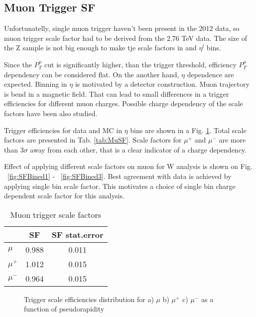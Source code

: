\subsection{Muon Trigger SF}
Unfortunatelly, single muon trigger haven't been present in the 2012 data, so muon trigger scale factor had to be derived from the 2.76 TeV data. The size of the Z sample is not big enough to make tje scale factors in \ptl and $\eta^{l}$ bins. 

Since the $P_{T}^{\mu}$ cut is significantly higher, than the trigger threshold, efficiency $P_{T}^{\mu}$ dependency can be considered flat. On the another hand, $\eta$ dependence are expected. Binning in $\eta$ is motivated by a detector construction. Muon trajectory is bend in a magnetic field. That can lead to small differences in a trigger efficiencies for different muon charges. Possible charge dependency of the scale factors have been also studied. 

Trigger efficiencies for data and MC in $\eta$ bins are shown in a Fig. \ref{fig:MuSF}. Total scale factors are presented in Tab. \ref{tab:MuSF}. Scale factors for $\mu^{+}$ and $\mu^{-}$ are more than 3$\sigma$ away from each other, that is a clear indicator of a charge dependency. 

Effect of applying different scale factors on muon for W analysis is shown on Fig. ~\ref{fig:SFBined1} - ~\ref{fig:SFBined3}. Best agreement with data is achieved by applying single bin scale factor. This motivates a choice of single bin charge dependent scale factor for this analysis. 

\begin{table}[!tbp]
    \caption{Muon trigger scale factors}
	\label{tab:MuonSF}
	\begin{center}
		\begin{tabular}{|l | c | c|}
		\hline
		& SF & SF stat.error\\
		\hline
		\hline
		$\mu$ & 0.988 & 0.011\\
		\hline
		$\mu^{+}$ & 1.012 & 0.015\\
		$\mu^{-}$ & 0.964 & 0.015\\
		\hline
		\end{tabular}
		\end{center}
\end{table}

\begin{figure}[!tbp]
\endminipage\hfill
{}
\endminipage\hfill
{}%
\endminipage
\caption{Trigger scale efficiencies distribution for a) $\mu$ b) $\mu^{+}$  c) $\mu^{-}$ as a function of pseudorapidity}
\label{fig:MuSF}
\end{figure}

